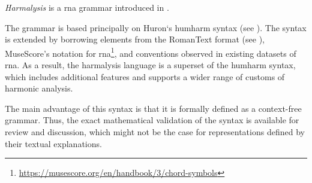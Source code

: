 

\emph{Harmalysis} is a \gls{rna} grammar introduced in
\textcite{napoleslopez2020harmalysis}.

The  grammar is based principally on
Huron‘s \gls{humharm} syntax (see
). The syntax is extended by
borrowing elements from the RomanText format (see
), MuseScore's notation for
\gls{rna}\footnote{\href{https://musescore.org/en/handbook/3/chord-symbols\#rna}{https://musescore.org/en/handbook/3/chord-symbols}},
and conventions observed in existing datasets of \gls{rna}.
As  a result,  the harmalysis language is a superset  of the
\gls{humharm} syntax,  which includes additional features
and supports a wider range of customs of harmonic analysis.

The main advantage of this syntax is that it is formally
defined as a context-free grammar. Thus, the exact
mathematical validation of the syntax is available for
review and discussion, which might not be the case for
representations defined by their textual explanations.
